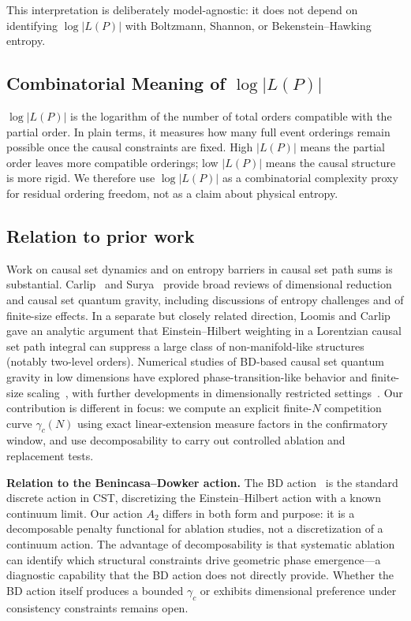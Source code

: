\documentclass[12pt,a4paper]{article}
\begin{document}
This interpretation is deliberately model-agnostic: it does not depend on
identifying $\log|L(P)|$ with Boltzmann, Shannon, or Bekenstein--Hawking
entropy.

\subsection{Combinatorial Meaning of $\log|L(P)|$}

$\log|L(P)|$ is the logarithm of the number of total orders compatible with
the partial order. In plain terms, it measures how many full event orderings
remain possible once the causal constraints are fixed. High $|L(P)|$ means the
partial order leaves more compatible orderings; low $|L(P)|$ means the causal
structure is more rigid. We therefore use $\log|L(P)|$ as a combinatorial
complexity proxy for residual ordering freedom, not as a claim about physical
entropy.

\subsection{Relation to prior work}

Work on causal set dynamics and on entropy barriers in causal set path sums is
substantial. Carlip~\cite{carlip2017} and Surya~\cite{surya2019} provide broad
reviews of dimensional reduction and causal set quantum gravity, including
discussions of entropy challenges and of finite-size effects. In a separate but
closely related direction, Loomis and Carlip~\cite{loomis2018} gave an analytic
argument that Einstein--Hilbert weighting in a Lorentzian causal set path
integral can suppress a large class of non-manifold-like structures (notably
two-level orders). Numerical studies of BD-based causal set quantum gravity in
low dimensions have explored phase-transition-like behavior and finite-size
scaling~\cite{surya2012,glaser2018}, with further developments in
dimensionally restricted settings~\cite{cunningham2020}. Our contribution is
different in focus: we compute an explicit finite-$N$ competition curve
$\gamma_c(N)$ using exact linear-extension measure factors in the confirmatory
window, and use decomposability to carry out controlled ablation and
replacement tests.

\textbf{Relation to the Benincasa--Dowker action.}
The BD action~\cite{benincasa2010,benincasa2011} is the standard discrete action
in CST, discretizing the Einstein--Hilbert action with a known continuum limit.
Our action $A_2$ differs in both form and purpose: it is a decomposable penalty
functional for ablation studies, not a discretization of a continuum action. The
advantage of decomposability is that systematic ablation can identify which
structural constraints drive geometric phase emergence---a diagnostic capability
that the BD action does not directly provide. Whether the BD action itself
produces a bounded $\gamma_c$ or exhibits dimensional preference under
consistency constraints remains open.
\end{document}
